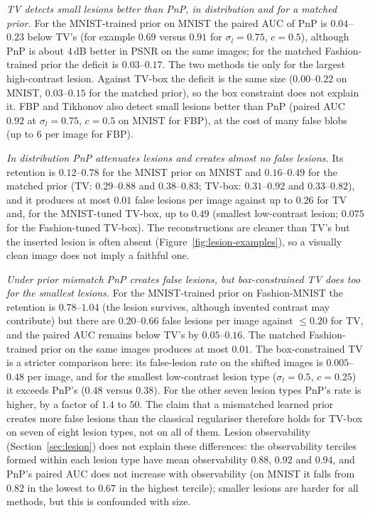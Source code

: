 \emph{TV detects small lesions better than PnP, in distribution and for a matched prior.} For the MNIST-trained prior on MNIST
the paired AUC of PnP is $0.04$--$0.23$ below TV's (for example $0.69$ versus $0.91$ for $\sigma_l=0.75$, $c=0.5$), although
PnP is about $4$\,dB better in PSNR on the same images; for the matched Fashion-trained prior the deficit is $0.03$--$0.17$. The
two methods tie only for the largest high-contrast lesion. Against TV-box the deficit is the same size ($0.00$--$0.22$ on MNIST,
$0.03$--$0.15$ for the matched prior), so the box constraint does not explain it. FBP and Tikhonov also detect small lesions better
than PnP (paired AUC $0.92$ at $\sigma_l=0.75$, $c=0.5$ on MNIST for FBP), at the cost of many false blobs (up to $6$ per image
for FBP).

\emph{In distribution PnP attenuates lesions and creates almost no false lesions.} Its retention is $0.12$--$0.78$ for the MNIST prior on MNIST
and $0.16$--$0.49$ for the matched prior (TV: $0.29$--$0.88$ and $0.38$--$0.83$; TV-box: $0.31$--$0.92$ and $0.33$--$0.82$), and it
produces at most $0.01$ false lesions per image against up to $0.26$ for TV and, for the MNIST-tuned TV-box, up to $0.49$
(smallest low-contrast lesion; $0.075$ for the Fashion-tuned TV-box). The reconstructions are cleaner than TV's but the inserted lesion is often absent
(Figure~\ref{fig:lesion-examples}), so a visually clean image does not imply a faithful one.

\emph{Under prior mismatch PnP creates false lesions, but box-constrained TV does too for the smallest lesions.} For the MNIST-trained
prior on Fashion-MNIST the retention is $0.78$--$1.04$ (the lesion survives, although invented contrast may contribute) but there are $0.20$--$0.66$ false lesions per image
against $\le0.20$ for TV, and the paired AUC remains below TV's by $0.05$--$0.16$. The matched Fashion-trained prior on the same
images produces at most $0.01$. The box-constrained TV is a stricter comparison here: its false-lesion rate on the shifted images is $0.005$--$0.48$ per image, and for
the smallest low-contrast lesion type ($\sigma_l=0.5$, $c=0.25$) it exceeds PnP's ($0.48$ versus $0.38$). For the other seven lesion types PnP's rate is higher, by a factor
of $1.4$ to $50$. The claim that a mismatched learned prior creates more false lesions than the classical regulariser therefore holds for TV-box on seven of eight lesion types, not on all of them.
Lesion observability (Section~\ref{sec:lesion}) does not explain these differences: the observability terciles formed within each
lesion type have mean observability $0.88$, $0.92$ and $0.94$, and PnP's paired AUC does not increase with observability (on MNIST
it falls from $0.82$ in the lowest to $0.67$ in the highest tercile); smaller lesions are harder for all methods, but this is
confounded with size.


